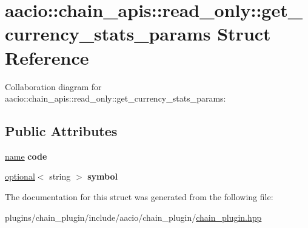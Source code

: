 \hypertarget{structaacio_1_1chain__apis_1_1read__only_1_1get__currency__stats__params}{}\section{aacio\+:\+:chain\+\_\+apis\+:\+:read\+\_\+only\+:\+:get\+\_\+currency\+\_\+stats\+\_\+params Struct Reference}
\label{structaacio_1_1chain__apis_1_1read__only_1_1get__currency__stats__params}


Collaboration diagram for aacio\+:\+:chain\+\_\+apis\+:\+:read\+\_\+only\+:\+:get\+\_\+currency\+\_\+stats\+\_\+params\+:
\subsection*{Public Attributes}
\begin{DoxyCompactItemize}
\item 
\mbox{\label{structaacio_1_1chain__apis_1_1read__only_1_1get__currency__stats__params_a6d02e28ce3b30ccf49a55b6a6d2c4af9}} 
\mbox{\hyperlink{structaacio_1_1name}{name}} {\bfseries code}
\item 
\mbox{\label{structaacio_1_1chain__apis_1_1read__only_1_1get__currency__stats__params_a0f523629473b202742756d1f7c934ff0}} 
\mbox{\hyperlink{classaacio_1_1optional}{optional}}$<$ string $>$ {\bfseries symbol}
\end{DoxyCompactItemize}


The documentation for this struct was generated from the following file\+:\begin{DoxyCompactItemize}
\item 
plugins/chain\+\_\+plugin/include/aacio/chain\+\_\+plugin/\mbox{\hyperlink{chain__plugin_8hpp}{chain\+\_\+plugin.\+hpp}}\end{DoxyCompactItemize}
